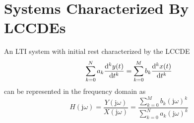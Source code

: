 \documentclass[10pt,UTF8]{article}
\newenvironment{definition box}
{\begin{tcolorbox}[colback=blue!5!white,colframe=blue!75!black,parbox=false,before upper=\par,before lower=\par]}
{\end{tcolorbox}}
\newenvironment{theorem box}
{\begin{tcolorbox}[colback=yellow!5!white,colframe=yellow!75!black,parbox=false,before upper=\par,before lower=\par]}
{\end{tcolorbox}}
\theoremstyle{definition}
\newtheorem{definition inner}{Definition}[section]
\theoremstyle{plain}
\newtheorem{theorem inner}{Theorem}[section]
\theoremstyle{definition}
\newtheorem*{proof inner}{\textit{Proof}}
\theoremstyle{remark}
\newcommand{\ju}{\mathrm{j}}  %
\begin{document}
\section{Systems Characterized By LCCDEs}

An LTI system with initial rest characterized by the LCCDE
\begin{equation*}
    \sum_{k=0}^{N} a_k \dv[k]{y(t)}{t} =
    \sum_{k=0}^{M} b_k \dv[k]{x(t)}{t}
\end{equation*}
can be represented in the frequency domain as
\begin{equation*}
    H(\ju\omega) =
    \frac{Y(\ju\omega)}{X(\ju\omega)} =
    \frac{\displaystyle\sum_{k=0}^{M} b_k (\ju\omega)^k}
    {\displaystyle\sum_{k=0}^{N} a_k (\ju\omega)^k}
\end{equation*}
\end{document}
